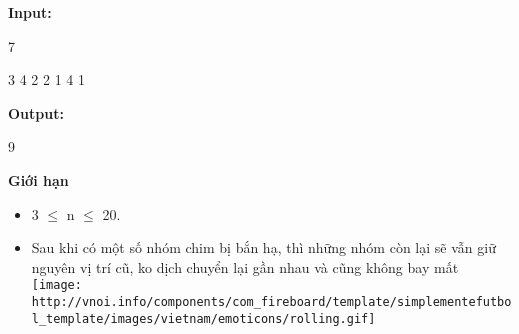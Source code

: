 \textbf{Input:}


7


3 4 2 2 1 4 1

\textbf{Output:}


9








\textbf{Giới hạn}
\begin{itemize}
	\item 3  $\le$  n  $\le$  20.
	\item Sau khi có một số nhóm chim bị bắn hạ, thì những nhóm còn lại sẽ vẫn giữ nguyên vị trí cũ, ko dịch chuyển lại gần nhau và cũng không bay mất 
\texttt{[image: http://vnoi.info/components/com\_fireboard/template/simplementefutbol\_template/images/vietnam/emoticons/rolling.gif]}
\end{itemize}